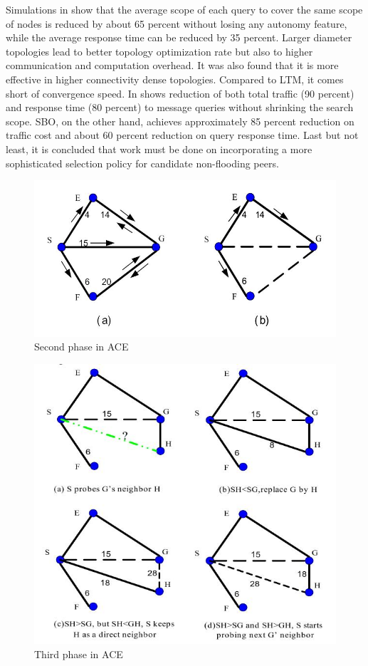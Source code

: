 \documentclass[a4paper,10pt]{article}
\begin{document}
Simulations in \cite{liu_acesims_2004} show that the average scope of each query to cover the same scope of nodes is reduced by about 65 percent without losing any autonomy feature, while the average response time can be reduced by 35 percent. Larger diameter topologies lead to better topology optimization rate but also to higher communication and computation overhead. It was also found that it is more effective in higher connectivity dense topologies. Compared to LTM, it comes short of convergence speed. In \cite{ni_mismatch_2004} shows reduction of both total traffic (90 percent) and response time (80 percent) to message queries without shrinking the search scope. SBO, on the other hand, achieves approximately 85 percent reduction on traffic cost and about 60 percent reduction on query response time. Last but not least, it is concluded that work must be done on incorporating a more sophisticated selection policy for candidate non-flooding peers.

\begin{figure}
\centering
  \includegraphics[scale=0.4]{img/ace_phase2.jpeg}
\caption{Second phase in ACE}
\label{figure:ace_phase2}
\end{figure}

\begin{figure}
\centering
  \includegraphics[scale=0.4]{img/ace_phase3.jpeg}
\caption{Third phase in ACE}
\label{figure:ace_phase3}
\end{figure}
\end{document}
